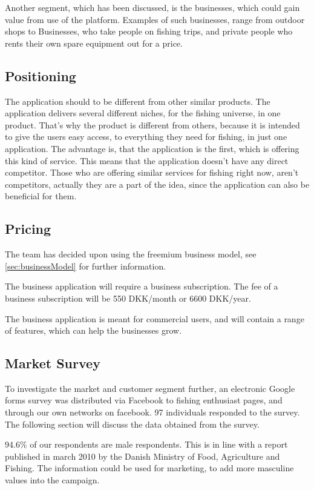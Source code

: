 Another segment, which has been discussed, is the businesses, which could gain value from use of the platform. Examples of such businesses, range from outdoor shops to Businesses, who take people on fishing trips, and private people who rents their own spare equipment out for a price.

\subsection{Positioning}
The application should to be different from other similar products. The application delivers several different niches, for the fishing universe, in one product. That's why the product is different from others, because it is intended to give the users easy access, to everything they need for fishing, in just one application. The advantage is, that the application is the first, which is offering this kind of service. This means that the application doesn't have any direct competitor. Those who are offering similar services for fishing right now, aren't competitors, actually they are a part of the idea, since the application can also be beneficial for them.



\subsection{Pricing}
The team has decided upon using the freemium business model, see \autoref{sec:businessModel} for further information.

The business application will require a business subscription. The fee of a business subscription will be 550 DKK/month or 6600 DKK/year.

The business application is meant for commercial users, and will contain a range of features, which can help the businesses grow.



\subsection{Market Survey}
To investigate the market and customer segment further, an electronic Google forms survey was distributed via Facebook to fishing enthusiast pages, and through our own networks on facebook. 97 individuals responded to the survey. The following section will discuss the data obtained from the survey. 


94.6\% of our respondents are male respondents. This is in line with a report published in march 2010 by the Danish Ministry of Food, Agriculture and Fishing. The information could be used for marketing, to add more masculine values into the campaign.


